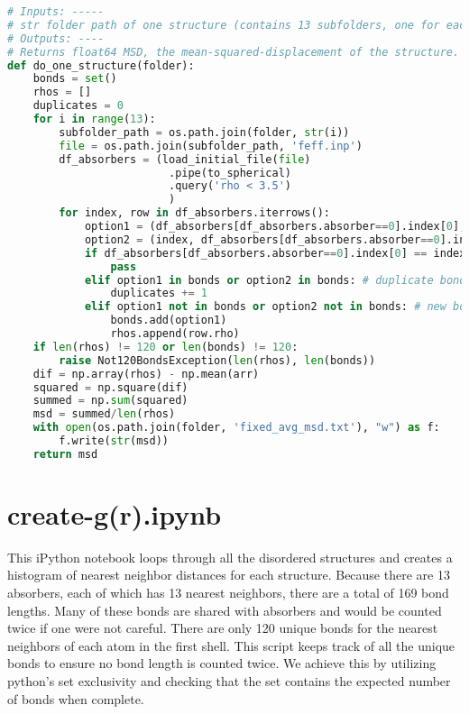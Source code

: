\pagebreak
\begin{lstlisting}[language=Python]
# Inputs: -----
# str folder path of one structure (contains 13 subfolders, one for each absober)
# Outputs: ----
# Returns float64 MSD, the mean-squared-displacement of the structure.
def do_one_structure(folder):
    bonds = set()
    rhos = []
    duplicates = 0
    for i in range(13):
        subfolder_path = os.path.join(folder, str(i))
        file = os.path.join(subfolder_path, 'feff.inp')
        df_absorbers = (load_initial_file(file)
                         .pipe(to_spherical)
                         .query('rho < 3.5')
                         )
        for index, row in df_absorbers.iterrows():
            option1 = (df_absorbers[df_absorbers.absorber==0].index[0], index)
            option2 = (index, df_absorbers[df_absorbers.absorber==0].index[0])
            if df_absorbers[df_absorbers.absorber==0].index[0] == index:
                pass
            elif option1 in bonds or option2 in bonds: # duplicate bond found
                duplicates += 1
            elif option1 not in bonds or option2 not in bonds: # new bond found
                bonds.add(option1)
                rhos.append(row.rho)
    if len(rhos) != 120 or len(bonds) != 120:
        raise Not120BondsException(len(rhos), len(bonds))
    dif = np.array(rhos) - np.mean(arr)
    squared = np.square(dif)
    summed = np.sum(squared)
    msd = summed/len(rhos)
    with open(os.path.join(folder, 'fixed_avg_msd.txt'), "w") as f:
        f.write(str(msd))
    return msd
\end{lstlisting}



\section{create-g(r).ipynb}

This iPython notebook loops through all the disordered structures and creates a histogram of nearest neighbor distances for each structure. Because there are 13 absorbers, each of which has 13 nearest neighbors, there are a total of 169 bond lengths. Many of these bonds are shared with absorbers and would be counted twice if one were not careful. There are only 120 unique bonds for the nearest neighbors of each atom in the first shell. This script keeps track of all the unique bonds to ensure no bond length is counted twice. We achieve this by utilizing python's set exclusivity and checking that the set contains the expected number of bonds when complete.



